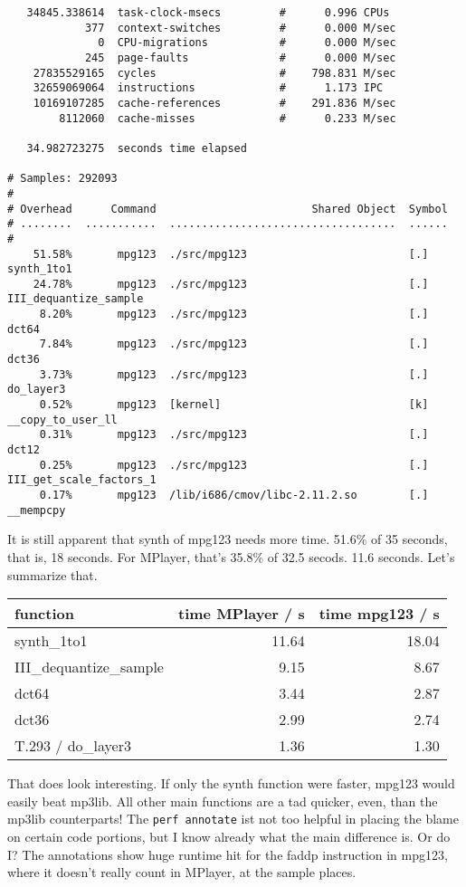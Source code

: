 \documentclass[a4paper,12pt]{scrartcl}
\begin{document}
\begin{verbatim}
   34845.338614  task-clock-msecs         #      0.996 CPUs
            377  context-switches         #      0.000 M/sec
              0  CPU-migrations           #      0.000 M/sec
            245  page-faults              #      0.000 M/sec
    27835529165  cycles                   #    798.831 M/sec
    32659069064  instructions             #      1.173 IPC
    10169107285  cache-references         #    291.836 M/sec
        8112060  cache-misses             #      0.233 M/sec
   
   34.982723275  seconds time elapsed

# Samples: 292093
#
# Overhead      Command                        Shared Object  Symbol
# ........  ...........  ...................................  ......
#
    51.58%       mpg123  ./src/mpg123                         [.] synth_1to1
    24.78%       mpg123  ./src/mpg123                         [.] III_dequantize_sample
     8.20%       mpg123  ./src/mpg123                         [.] dct64
     7.84%       mpg123  ./src/mpg123                         [.] dct36
     3.73%       mpg123  ./src/mpg123                         [.] do_layer3
     0.52%       mpg123  [kernel]                             [k] __copy_to_user_ll
     0.31%       mpg123  ./src/mpg123                         [.] dct12
     0.25%       mpg123  ./src/mpg123                         [.] III_get_scale_factors_1
     0.17%       mpg123  /lib/i686/cmov/libc-2.11.2.so        [.] __mempcpy
\end{verbatim}
It is still apparent that synth of mpg123 needs more time. 51.6\% of 35 seconds, that is, 18 seconds.
For MPlayer, that's 35.8\% of 32.5 secods. 11.6 seconds.
Let's summarize that.
\begin{center}
\begin{tabular}{lrr}
function & time MPlayer / s & time mpg123 / s
\\\hline
synth\_1to1 & 11.64 & 18.04 \\
III\_dequantize\_sample & 9.15 & 8.67 \\
dct64 & 3.44 & 2.87 \\
dct36 & 2.99 & 2.74 \\
T.293 / do\_layer3 & 1.36 & 1.30
\end{tabular}
\end{center}

That does look interesting. If only the synth function were faster, mpg123 would easily beat mp3lib. All other main functions are a tad quicker, even, than the mp3lib counterparts!
The \verb:perf annotate: ist not too helpful in placing the blame on certain code portions, but I know already what the main difference is. Or do I?
The annotations show huge runtime hit for the faddp instruction in mpg123, where it doesn't really count in MPlayer, at the sample places.
\end{document}
